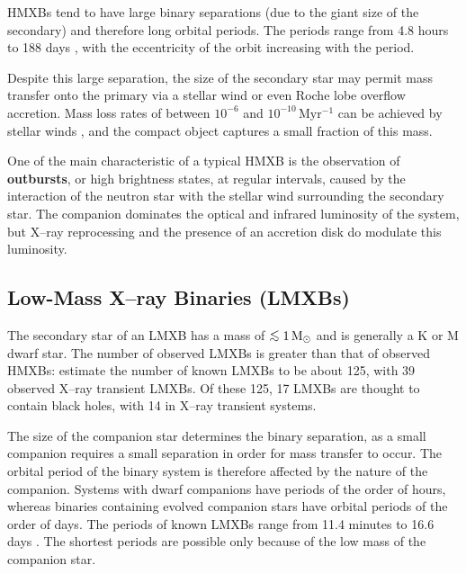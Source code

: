 \vspace{\myparskip}

HMXBs tend to have large binary separations (due to the giant size of
the secondary) and therefore long orbital periods. The periods range from 4.8 hours to 188 days
\cite{VanParadijs:1995}, with the eccentricity of the orbit increasing with the period. %

\vspace{\myparskip}

Despite this large separation, the size of the secondary star may
permit mass transfer onto the primary via a stellar wind or even Roche lobe
overflow accretion. %
Mass loss rates of between $10^{-6}$ and $10^{-10}$\,M\sun $\mathrm{yr}^{-1}$ can be
achieved by stellar winds %
\cite{WhiteNagaseParmar:1995}, %
and the compact object captures a small fraction of this mass. %

\vspace{\myparskip}

One of the main characteristic of a typical HMXB is the observation of
\textbf{outbursts}, or high brightness states, at regular intervals,
caused by the interaction of the neutron star with the stellar wind
surrounding the
secondary star. The companion dominates the optical and infrared
luminosity of the system, but X--ray reprocessing and the presence of an accretion disk do modulate
this luminosity. %


\subsection{Low-Mass X--ray Binaries (LMXBs)}
\label{cha:Introduction:sec:X--rayBinaries:subsec:LMXBs}

The secondary star of an LMXB has a mass of $\lsim 1\,\mathrm{M}\sun$
and is generally a K or M dwarf star. The number of observed LMXBs is greater than that of observed HMXBs: %
estimate the number of known LMXBs to be about 125, with 39 observed
X--ray transient LMXBs. Of these 125, 17 LMXBs are thought to contain black holes, with 14 in X--ray transient systems. %

\vspace{\myparskip}

The size of the companion star determines the binary separation, as a
small companion requires a small separation in order for mass transfer to
occur. The orbital period of the binary system is therefore affected by the
nature of the companion. Systems with dwarf companions have
periods of the order of hours, whereas binaries containing evolved
companion stars have orbital periods of the order of days. The periods of known LMXBs range from 11.4 minutes to 16.6 days %
\cite{VanParadijs:1995}. %
The shortest periods are possible only because of the low mass of the
companion star. %


